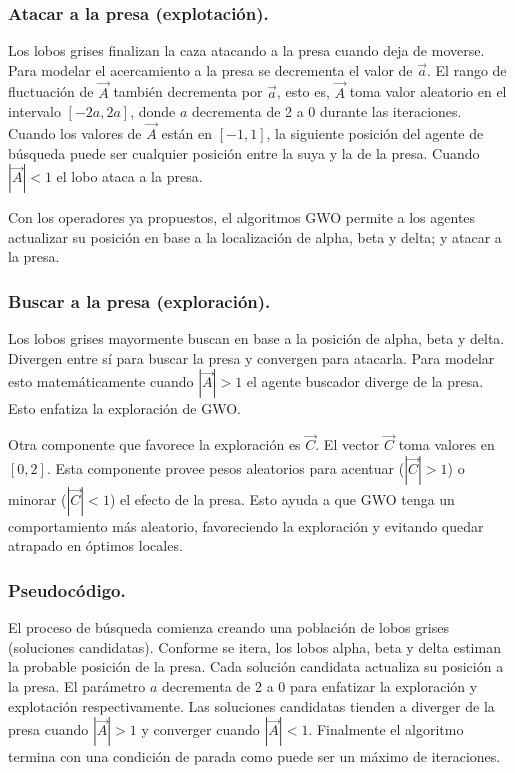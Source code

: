\documentclass[11pt,a4paper]{article}
\theoremstyle{definition}
\begin{document}
	\subsubsection{Atacar a la presa (explotación).}
	Los lobos grises finalizan la caza atacando a la presa cuando deja de moverse. Para modelar el acercamiento a la presa se decrementa el valor de $\vec{a}$. El rango de fluctuación de $\vec{A}$ también decrementa por $\vec{a}$, esto es, $\vec{A}$ toma valor aleatorio en el intervalo $[-2a,2a]$, donde $a$ decrementa de 2 a 0 durante las iteraciones. Cuando los valores de $\vec{A}$ están en $[-1,1]$, la siguiente posición del agente de búsqueda puede ser cualquier posición entre la suya y la de la presa. Cuando $|\vec{A}|<1$ el lobo ataca a la presa.
	
	Con los operadores ya propuestos, el algoritmos GWO permite a los agentes actualizar su posición en base a la localización de alpha, beta y delta; y atacar a la presa. 
	\subsubsection{Buscar a la presa (exploración).}
	Los lobos grises mayormente buscan en base a la posición de alpha, beta y delta. Divergen entre sí para buscar la presa y convergen para atacarla. Para modelar esto matemáticamente cuando $|\vec{A}|>1$ el agente buscador diverge de la presa. Esto enfatiza la exploración de GWO. 
	
	Otra componente que favorece la exploración es $\vec{C}$. El vector $\vec{C}$ toma valores en $[0,2]$. Esta componente provee pesos aleatorios para acentuar ($|\vec{C}|>1$) o minorar ($|\vec{C}|<1$) el efecto de la presa. Esto ayuda a que GWO tenga un comportamiento más aleatorio, favoreciendo la exploración y evitando quedar atrapado en óptimos locales.
	\subsubsection{Pseudocódigo.}
	
	El proceso de búsqueda comienza creando una población de lobos grises (soluciones candidatas). Conforme se itera, los lobos alpha, beta y delta estiman la probable posición de la presa. Cada solución candidata actualiza su posición a la presa. El parámetro $a$ decrementa de 2 a 0 para enfatizar la exploración y explotación respectivamente. Las soluciones candidatas tienden a diverger de la presa cuando $|\vec{A}|>1$ y converger cuando $|\vec{A}|<1$. Finalmente el algoritmo termina con una condición de parada como puede ser un máximo de iteraciones.
	
\end{document}
